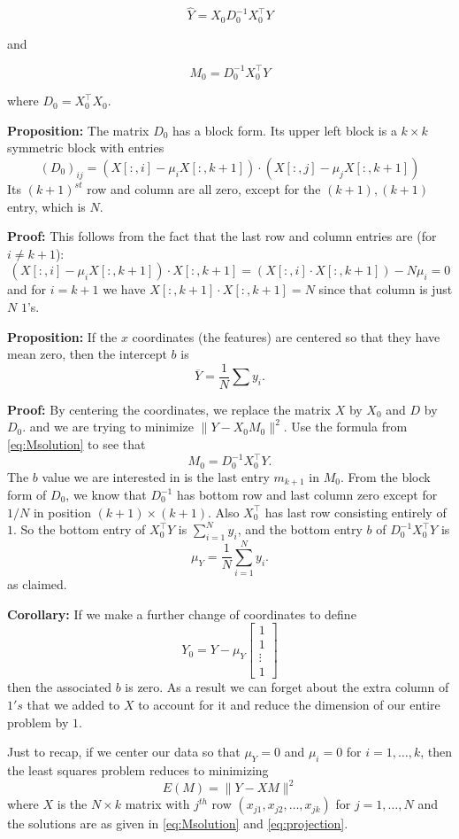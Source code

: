 \documentclass[]{article}
\begin{document}
\[ \hat{Y} = X_{0}D_{0}^{-1}X_{0}^{\intercal}Y \]

and

\[ M_{0} = D_{0}^{-1}X_{0}^{\intercal}Y \]

where \(D_{0}=X_{0}^{\intercal}X_{0}.\)

\textbf{Proposition:} The matrix \(D_{0}\) has a block form. Its upper
left block is a \(k\times k\) symmetric block with entries
\[ (D_{0})_{ij} =
(X[:,i]-\mu_{i}X[:,k+1])\cdot(X[:,j]-\mu_{j}X[:,k+1]) \] Its
\((k+1)^{st}\) row and column are all zero, except for the
\((k+1),(k+1)\) entry, which is \(N\).

\textbf{Proof:} This follows from the fact that the last row and column
entries are (for \(i\not=k+1\)): \[ (X[:,i]-\mu_{i}X[:,k+1])\cdot
X[:,k+1] = (X[:,i]\cdot X[:,k+1])-N\mu_{i} = 0 \] and for \(i=k+1\) we
have \(X[:,k+1]\cdot X[:,k+1]=N\) since that column is just \(N\)
\(1\)'s.

\textbf{Proposition:} If the \(x\) coordinates (the features) are
centered so that they have mean zero, then the intercept \(b\) is
\[ \overline{Y} =
\frac{1}{N}\sum y_{i}.  \]

\textbf{Proof:} By centering the coordinates, we replace the matrix
\(X\) by \(X_{0}\) and \(D\) by \(D_{0}\). and we are trying to minimize
\(\|Y-X_{0}M_{0}\|^2\). Use the formula from \cref{eq:Msolution} to see
that \[ M_{0} = D_{0}^{-1}X_{0}^{\intercal}Y.  \] The \(b\) value we are
interested in is the last entry \(m_{k+1}\) in \(M_{0}\). From the block
form of \(D_{0}\), we know that \(D_{0}^{-1}\) has bottom row and last
column zero except for \(1/N\) in position \((k+1)\times(k+1)\). Also
\(X_{0}^{\intercal}\) has last row consisting entirely of \(1\). So the
bottom entry of \(X_{0}^{\intercal}Y\) is \(\sum_{i=1}^{N} y_{i}\), and
the bottom entry \(b\) of \(D_{0}^{-1}X_{0}^{\intercal}Y\) is
\[ \mu_{Y} =
\frac{1}{N}\sum_{i=1}^{N} y_{i}.  \] as claimed.

\textbf{Corollary:} If we make a further change of coordinates to define
\[
Y_{0} = Y - \mu_{Y}\left[\begin{matrix} 1 \\ 1 \\ \vdots \\
1\end{matrix}\right] \] then the associated \(b\) is zero. As a result
we can forget about the extra column of \(1's\) that we added to \(X\)
to account for it and reduce the dimension of our entire problem by
\(1\).

Just to recap, if we center our data so that \(\mu_{Y}=0\) and
\(\mu_{i}=0\) for \(i=1,\ldots, k\), then the least squares problem
reduces to minimizing \[ E(M) = \|Y-XM\|^2 \] where \(X\) is the
\(N\times k\) matrix with \(j^{th}\) row
\((x_{j1},x_{j2},\ldots, x_{jk})\) for \(j=1,\ldots, N\) and the
solutions are as given in \cref{eq:Msolution} and \cref{eq:projection}.
\end{document}
